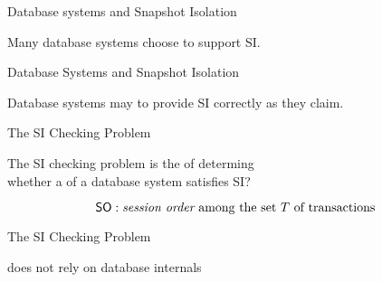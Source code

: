 
\begin{frame}{Database systems and Snapshot Isolation}
  \begin{center}
    Many database systems choose to support SI.

    \vspace{0.30cm}
  \end{center}
\end{frame}

\begin{frame}{Database Systems and Snapshot Isolation}
  \begin{center}
    Database systems may  to provide SI correctly as they claim.

    \vspace{0.30cm}
  \end{center}
\end{frame}

\begin{frame}{The SI Checking Problem}
  \begin{definition}
    The SI checking problem is the  of determing \\[5pt]
    whether a  of a database system satisfies SI?
  \end{definition}


  \vspace{-0.50cm}
  \[
    \textup{\textsf{SO}}: \text{{\it session order} among the set $T$ of transactions}
  \]
\end{frame}

\begin{frame}{The SI Checking Problem}
  \begin{center}
     does not rely on database internals

    \vspace{0.20cm}
    \resizebox{0.55\textwidth}{!}{}
    \vspace{0.20cm}

  \end{center}
\end{frame}

